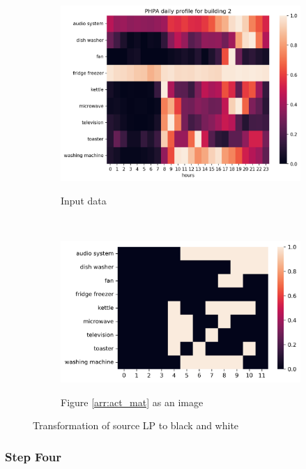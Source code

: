 \begin{figure}[H]
	\begin{subfigure}{.5\textwidth}
		\caption{Input data}
		\includegraphics[width=1\linewidth]{../Figures/LPS/PHPA.png}
		\label{fig:ec_PHPA}
	\end{subfigure}%
	~ 
	\begin{subfigure}{.5\textwidth}
		\caption{Figure \protect\ref{arr:act_mat} as an image}
		\includegraphics[width=1\linewidth]{../Figures/LPS/PHPA_EC.png}
		\label{fig:ec_PHPA_bw}
	\end{subfigure}%

	\caption{Transformation of source LP to black and white}
\end{figure}

\subsubsection{Step Four}

